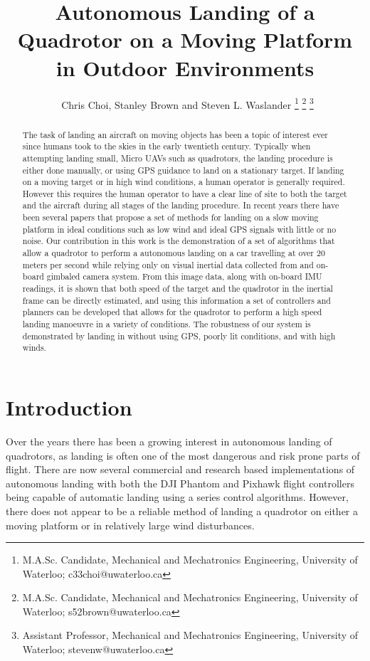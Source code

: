 \documentclass[letterpaper, 10 pt, conference]{ieeeconf}
\title{\large \textbf Autonomous Landing of a Quadrotor on a Moving Platform in
Outdoor Environments}
\author{\
Chris Choi\authorrefmark{1}, Stanley Brown\authorrefmark{2} and  Steven L. Waslander\authorrefmark{3}
\thanks{\superscript{*} M.A.Sc. Candidate, Mechanical and Mechatronics Engineering, University of Waterloo; c33choi@uwaterloo.ca}
\thanks{\superscript{2} M.A.Sc. Candidate, Mechanical and Mechatronics Engineering, University of Waterloo; s52brown@uwaterloo.ca}
\thanks{\superscript{\dag} Assistant Professor, Mechanical and Mechatronics Engineering, University of Waterloo; stevenw@uwaterloo.ca}
\vspace{0.5in}
}
\begin{document}
\maketitle
\thispagestyle{empty}
\pagestyle{empty}

\begin{abstract}
The task of landing an aircraft on moving objects has been a topic of interest
ever since humans took to the skies in the early twentieth century. Typically
when attempting landing small, Micro UAVs such as quadrotors, the landing
procedure is either done manually, or using GPS guidance to land on a
stationary target. If landing on a moving target or in high wind conditions, a
human operator is generally required. However this requires the human operator
to have a clear line of site to both the target and the aircraft during all
stages of the landing procedure. In recent years there have been several papers
that propose a set of methods for landing on a slow moving platform in ideal
conditions such as low wind and ideal GPS signals with little or no noise. Our
contribution in this work is the demonstration of a set of algorithms that
allow a quadrotor to perform a autonomous landing on a car travelling at over 20
meters per second while relying only on visual inertial data collected from and
on-board gimbaled camera system. From this image data, along with on-board IMU
readings, it is shown that both speed of the target and the quadrotor in the
inertial frame can be directly estimated, and using this information a set of
controllers and planners can be developed that allows for the quadrotor to
perform a high speed landing manoeuvre in a variety of conditions. The
robustness of our system is demonstrated by landing in without using GPS,
poorly lit conditions, and with high winds.
\end{abstract}


\section{Introduction}
Over the years there has been a growing interest in autonomous landing of
quadrotors, as landing is often one of the most dangerous and risk prone parts
of flight. There are now several commercial and research based implementations
of autonomous landing with both the DJI Phantom and Pixhawk flight controllers
being capable of automatic landing using a series control algorithms. However,
there does not appear to be a reliable method of landing a quadrotor on either
a moving platform or in relatively large wind disturbances.
\end{document}

